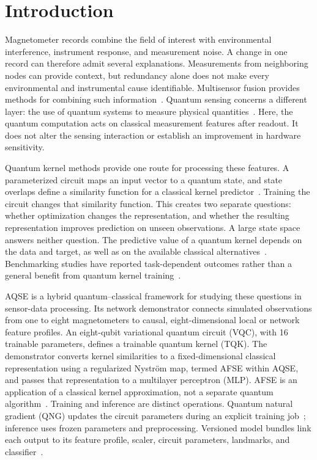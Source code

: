 \section{Introduction}
\label{sec:introduction}

Magnetometer records combine the field of interest with environmental interference, instrument response, and measurement noise. A change in one record can therefore admit several explanations. Measurements from neighboring nodes can provide context, but redundancy alone does not make every environmental and instrumental cause identifiable. Multisensor fusion provides methods for combining such information~\cite{hall1997fusion}. Quantum sensing concerns a different layer: the use of quantum systems to measure physical quantities~\cite{degen2017sensing}. Here, the quantum computation acts on classical measurement features after readout. It does not alter the sensing interaction or establish an improvement in hardware sensitivity.

Quantum kernel methods provide one route for processing these features. A parameterized circuit maps an input vector to a quantum state, and state overlaps define a similarity function for a classical kernel predictor~\cite{schuld2019feature,havlicek2019supervised}. Training the circuit changes that similarity function. This creates two separate questions: whether optimization changes the representation, and whether the resulting representation improves prediction on unseen observations. A large state space answers neither question. The predictive value of a quantum kernel depends on the data and target, as well as on the available classical alternatives~\cite{huang2021power}. Benchmarking studies have reported task-dependent outcomes rather than a general benefit from quantum kernel training~\cite{alvarez2025benchmarking,schnabel2025scrutiny}.

AQSE is a hybrid quantum--classical framework for studying these questions in sensor-data processing. Its network demonstrator connects simulated observations from one to eight magnetometers to causal, eight-dimensional local or network feature profiles. An eight-qubit variational quantum circuit (VQC), with 16 trainable parameters, defines a trainable quantum kernel (TQK). The demonstrator converts kernel similarities to a fixed-dimensional classical representation using a regularized Nystr\"om map, termed AFSE within AQSE, and passes that representation to a multilayer perceptron (MLP). AFSE is an application of a classical kernel approximation, not a separate quantum algorithm~\cite{williams2001nystrom}. Training and inference are distinct operations. Quantum natural gradient (QNG) updates the circuit parameters during an explicit training job~\cite{stokes2020qng}; inference uses frozen parameters and preprocessing. Versioned model bundles link each output to its feature profile, scaler, circuit parameters, landmarks, and classifier~\cite{aqse2026canonical}.

